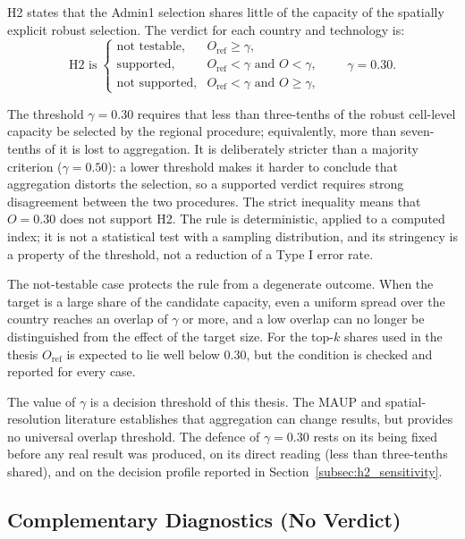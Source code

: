 H2 states that the Admin1 selection shares little of the capacity of the
spatially explicit robust selection. The verdict for each country and
technology is:
\begin{equation}
    \text{H2 is}\;
    \begin{cases}
        \text{not testable}, & O_{\mathrm{ref}}\geq\gamma,\\
        \text{supported}, & O_{\mathrm{ref}}<\gamma \text{ and } O<\gamma,\\
        \text{not supported}, & O_{\mathrm{ref}}<\gamma \text{ and } O\geq\gamma,
    \end{cases}
    \qquad \gamma=0.30 .
    \label{eq:h2_rule}
\end{equation}

The threshold $\gamma=0.30$ requires that less than three-tenths of the robust
cell-level capacity be selected by the regional procedure; equivalently, more
than seven-tenths of it is lost to aggregation. It is deliberately stricter
than a majority criterion ($\gamma=0.50$): a lower threshold makes it harder to
conclude that aggregation distorts the selection, so a supported verdict
requires strong disagreement between the two procedures. The strict inequality
means that $O=0.30$ does not support H2. The rule is deterministic, applied to a
computed index; it is not a statistical test with a sampling distribution, and
its stringency is a property of the threshold, not a reduction of a Type I error
rate.

The not-testable case protects the rule from a degenerate outcome. When the
target is a large share of the candidate capacity, even a uniform spread over
the country reaches an overlap of $\gamma$ or more, and a low overlap can no
longer be distinguished from the effect of the target size. For the top-$k$
shares used in the thesis $O_{\mathrm{ref}}$ is expected to lie well below
$0.30$, but the condition is checked and reported for every case.

The value of $\gamma$ is a decision threshold of this thesis. The MAUP and
spatial-resolution literature establishes that aggregation can change results,
but provides no universal overlap threshold. The defence of $\gamma=0.30$ rests
on its being fixed before any real result was produced, on its direct reading
(less than three-tenths shared), and on the decision profile reported in
Section~\ref{subsec:h2_sensitivity}.

\subsection{Complementary Diagnostics (No Verdict)}
\label{subsec:h2_diagnostics}

